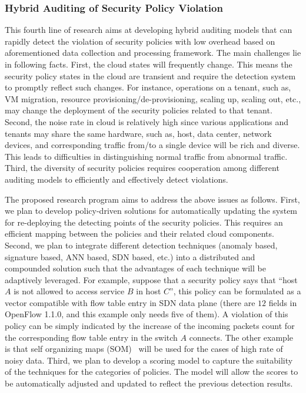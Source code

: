 \documentclass[12pt]{article}
\begin{document}
  
\vspace{-3mm}
\subsubsection{Hybrid Auditing of Security Policy Violation}
\label{subsec:5.2}
\vspace{-2mm} 

This fourth line of research aims at developing hybrid auditing models
that can rapidly detect the violation of security policies with low
overhead based on aforementioned data collection and processing
framework. The main challenges lie in following facts. First, the
cloud states will frequently change. This means the security policy
states in the cloud are transient and require the detection system to
promptly reflect such changes. For instance, operations on a tenant,
such as, VM migration, resource provisioning/de-provisioning, scaling
up, scaling out, etc., may change the deployment of the security
policies related to that tenant. Second, the noise rate in cloud is
relatively high since various applications and tenants may share the
same hardware, such as, host, data center, network devices, and
corresponding traffic from/to a single device will be rich and
diverse. This leads to difficulties in distinguishing normal traffic
from abnormal traffic. Third, the diversity of security policies
requires  cooperation among different auditing models to
efficiently and effectively detect violations.

The proposed research program aims to address the above issues as
follows. First, we plan to develop policy-driven solutions for
automatically updating the system for re-deploying the detecting
points of the security policies. This requires an efficient mapping
between the policies and their related cloud components. Second, we
plan to integrate different detection techniques (anomaly based,
signature based, ANN based, SDN based, etc.) into a distributed and
compounded solution such that the advantages of each technique will be
adaptively leveraged. For example, suppose that a security policy says
that ``host $A$ is not allowed to access service $B$ in host $C$'',
this policy can be formulated as a vector compatible with flow table
entry in SDN data plane (there are $12$ fields in OpenFlow 1.1.0, and
this example only needs five of them).  A violation of this policy can
be simply indicated by the increase of the incoming packets count for
the corresponding flow table entry in the switch $A$ connects. The
other example is that self organizing maps (SOM)~\cite{5735752} will
be used for the cases of high rate of noisy data. Third, we plan to
develop a scoring model to capture the suitability of the techniques
for the categories of policies. The model will allow the scores to be
automatically adjusted and updated to reflect the previous detection
results.
\end{document}

